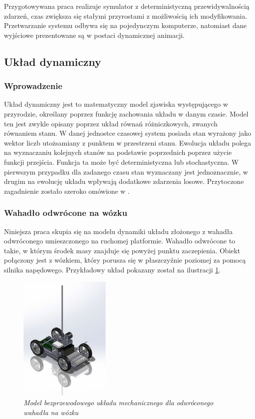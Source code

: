 \documentclass[12pt, oneside]{report}
\theoremstyle{definition}
\begin{document}
Przygotowywana praca realizuje symulator z deterministyczną przewidywalnością zdarzeń, czas zwiększa się stałymi przyrostami z możliwością ich modyfikowania. Przetwarzanie systemu odbywa się na pojedynczym komputerze, natomiast dane wyjściowe prezentowane są w postaci dynamicznej animacji.

\subsection{Układ dynamiczny}
\subsubsection{Wprowadzenie}
Układ dynamiczny jest to matematyczny model zjawiska występującego w przyrodzie, określany poprzez funkcję zachowania układu w danym czasie. Model ten jest zwykle opisany poprzez układ równań różniczkowych, zwanych równaniem stanu. W danej jednostce czasowej system posiada stan wyrażony jako wektor liczb utożsamiany z punktem w przestrzeni stanu. Ewolucja układu polega na wyznaczaniu kolejnych stanów na podstawie poprzednich poprzez użycie funkcji przejścia. Funkcja ta może być deterministyczna lub stochastyczna. W pierwszym przypadku dla zadanego czasu stan wyznaczany jest jednoznacznie, w drugim na ewolucję układu wpływają dodatkowe zdarzenia losowe. Przytoczone zagadnienie zostało szeroko omówione w \cite{MarciniakDynamicSystems}.

\subsubsection{Wahadło odwrócone na wózku}
\label{SubsectionPendulumIntro}
Niniejsza praca skupia się na modelu dynamiki układu złożonego z wahadła odwróconego umieszczonego na ruchomej platformie. Wahadło odwrócone to takie, w którym środek masy znajduje się powyżej punktu zaczepienia. Obiekt połączony jest z wózkiem, który porusza się w płaszczyźnie poziomej za pomocą silnika napędowego. Przykładowy układ pokazany został na ilustracji \ref{SystemModelImage}.

\begin{figure}[H]
	\centering
		\includegraphics[width = 125pt]{SystemModel} 
		\caption{\textit{Model bezprzewodowego układu mechanicznego dla odwróconego wahadła na wózku \cite{SystemModel}}}
		\label{SystemModelImage}
\end{figure}
\end{document}
